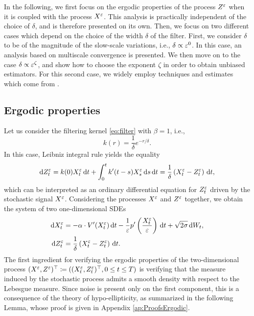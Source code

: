 \documentclass[10pt]{article}
\begin{document}
{In the following, we first focus on the ergodic properties of the process $Z^\varepsilon$ when it is coupled with the process $X^\varepsilon$. This analysis is practically independent of the choice of $\delta$, and is therefore presented on its own. Then, we focus on two different cases which depend on the choice of the width $\delta$ of the filter. First, we consider $\delta$ to be of the magnitude of the slow-scale variations, i.e., $\delta \propto \varepsilon^0$. In this case, an analysis based on multiscale convergence is presented. We then move on to the case $\delta \propto \varepsilon^\zeta$, and show how to choose the exponent $\zeta$ in order to obtain unbiased estimators. For this second case, we widely employ techniques and estimates which come from \cite{PaS07}.
}


\subsection{Ergodic properties}\label{sec:ergodic}

Let us consider the filtering kernel \eqref{eq:filter} with $\beta = 1$, i.e.,
\begin{equation}\label{eq:filter_beta1}
	k(r) = \frac{1}{\delta} e^{-r/\delta}.
\end{equation}
In this case, Leibniz integral rule yields the equality
\begin{equation}
	\mathrm{d} Z^\varepsilon_t = k(0) X^\varepsilon_t \,\mathrm{d} t + \int_0^t k'(t-s) X^\varepsilon_s \,\mathrm{d} s \,\mathrm{d} t = \frac{1}{\delta} \left ( X^\varepsilon_t - Z^\varepsilon_t \right ) \,\mathrm{d} t,
\end{equation}
which can be interpreted as an ordinary differential equation for $Z_t^\varepsilon$ driven by the stochastic signal $X^\varepsilon$. Considering the processes $X^\varepsilon$ and $Z^\varepsilon$ together, we obtain the system of two one-dimensional SDEs
\begin{equation}
\label{eq:systemSDE}
\begin{aligned}
\mathrm{d} X_t^\varepsilon &= -\alpha \cdot V'(X_t^\varepsilon) \,\mathrm{d} t - \frac1{\varepsilon} p'\left(\frac{X_t^\varepsilon}{\varepsilon}\right) \,\mathrm{d} t+ \sqrt{2\sigma} \,\mathrm{d} W_t, \\
\mathrm{d} Z^\varepsilon_t &= \frac{1}{\delta} \left ( X^\varepsilon_t - Z^\varepsilon_t \right ) \,\mathrm{d} t.
\end{aligned}
\end{equation}
The first ingredient for verifying the ergodic properties of the two-dimensional process $(X^\varepsilon, Z^\varepsilon)^\top \coloneqq ((X^\varepsilon_t, Z^\varepsilon_t)^\top, 0 \leq t \leq T)$ is verifying that the measure induced by the stochastic process admits a smooth density with respect to the Lebesgue measure. Since noise is present only on the first component, this is a consequence of the theory of hypo-ellipticity, as summarized in the following Lemma, whose proof is given in Appendix \ref{ap:ProofsErgodic}.
\end{document}
